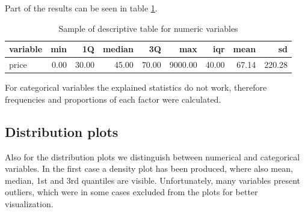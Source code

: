 Part of the results can be seen in table \ref{table:descrstatnum}.



\begin{table}[H]
\centering
\begin{tabular}{lrrrrrrrr}
  \hline \hline
variable & min & 1Q & median & 3Q & max & iqr & mean & sd \\ 
  \hline
price & 0.00 & 30.00 & 45.00 & 70.00 & 9000.00 & 40.00 & 67.14 & 220.28 \\ 
   \hline \hline
\end{tabular}
\caption{Sample of descriptive table for numeric variables}
\label{table:descrstatnum}
\end{table}

For categorical variables the explained statistics do not work, therefore frequencies and proportions of each factor were calculated.




\subsection{Distribution plots}\label{subsec:distrplots}

Also for the distribution plots we distinguish between numerical and categorical variables. In the first case a density plot has been produced, where also mean, median, 1st and 3rd quantiles are visible.
Unfortunately, many variables present outliers, which were in some cases excluded from the plots for better visualization.

